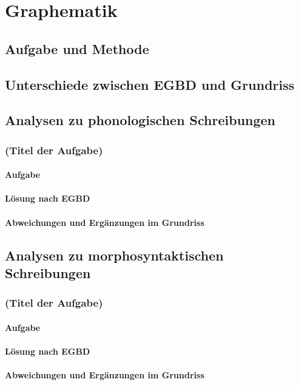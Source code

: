 \chapter{Graphematik}
\label{sec:graphematik}

\section{Aufgabe und Methode}
\label{sec:graphematik:aufgabeundmethoden}

\section{Unterschiede zwischen EGBD und Grundriss}
\label{sec:graphematik:unterschiedezwischenegbdundgrundriss}

\section{Analysen zu phonologischen Schreibungen}
\label{sec:graphematik:analysenzuphonologischenschreibungen}

\subsection{(Titel der Aufgabe)}

\subsubsection{Aufgabe}

\subsubsection{Lösung nach EGBD}

\subsubsection{Abweichungen und Ergänzungen im Grundriss}


\section{Analysen zu morphosyntaktischen Schreibungen}
\label{sec:graphematik:analysenzumorphosyntaktischenschreibungen}

\subsection{(Titel der Aufgabe)}

\subsubsection{Aufgabe}

\subsubsection{Lösung nach EGBD}

\subsubsection{Abweichungen und Ergänzungen im Grundriss}
